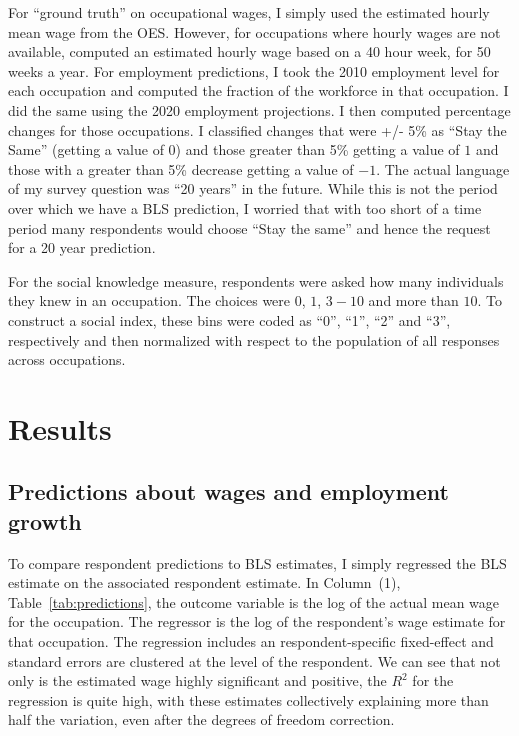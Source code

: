 \documentclass[12pt]{article}
\begin{document}
For ``ground truth'' on occupational wages, I simply used the estimated hourly mean wage from the OES.
However, for occupations where hourly wages are not available, computed an estimated hourly wage based on a 40 hour week, for 50 weeks a year.  
For employment predictions, I took the 2010 employment level for each occupation and computed the fraction of the workforce in that occupation. 
I did the same using the 2020 employment projections. 
I then computed percentage changes for those occupations. 
I classified changes that were +/- 5\% as ``Stay the Same'' (getting a value of $0$) and those greater than 5\% getting a value of $1$ and those with a greater than 5\% decrease getting a value of $-1$.  
The actual language of my survey question was ``20 years'' in the future. 
While this is not the period over which we have a BLS prediction, I worried that with too short of a time period many respondents would choose ``Stay the same'' and hence the request for a 20 year prediction.  

For the social knowledge measure, respondents were asked how many individuals they knew in an occupation. 
The choices were $0$, $1$, $3-10$ and more than $10$. 
To construct a social index, these bins were coded as ``0'', ``1'', ``2'' and ``3'', respectively and then normalized with respect to the population of all responses across occupations. 

\section{Results}

\subsection{Predictions about wages and employment growth}

To compare respondent predictions to BLS estimates, I simply regressed the BLS estimate on the associated respondent estimate. 
In Column~(1), Table~\ref{tab:predictions}, the outcome variable is the log of the actual mean wage for the occupation. 
The regressor is the log of the respondent's wage estimate for that occupation. 
The regression includes an respondent-specific fixed-effect and standard errors are clustered at the level of the respondent. 
We can see that not only is the estimated wage highly significant and positive, the $R^2$ for the regression is quite high, with these estimates collectively explaining more than half the variation, even after the degrees of freedom correction. 
\end{document}
